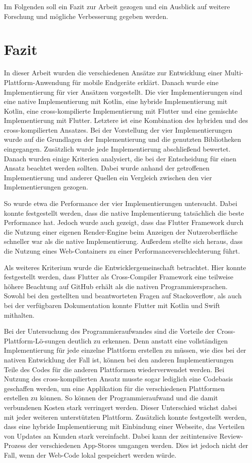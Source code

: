 Im Folgenden soll ein Fazit zur Arbeit gezogen und ein Ausblick auf weitere Forschung und mögliche Verbesserung gegeben werden.

\section{Fazit}
In dieser Arbeit wurden die verschiedenen Ansätze zur Entwicklung einer Multi-Plattform-Anwendung für mobile Endgeräte erklärt. Danach wurde eine Implementierung für vier Ansätzen vorgestellt. Die vier Implementierungen sind eine native Implementierung mit Kotlin, eine hybride Implementierung mit Kotlin, eine cross-kompilierte Implementierung mit Flutter und eine gemischte Implementierung mit Flutter. Letztere ist eine Kombination des hybriden und des cross-kompilierten Ansatzes. Bei der Vorstellung der vier Implementierungen wurde auf die Grundlagen der Implementierung und die genutzten Bibliotheken eingegangen. Zusätzlich wurde jede Implementierung abschließend bewertet. Danach wurden einige Kriterien analysiert, die bei der Entscheidung für einen Ansatz beachtet werden sollten. Dabei wurde anhand der getroffenen Implementierung und anderer Quellen ein Vergleich zwischen den vier Implementierungen gezogen.

So wurde etwa die Performance der vier Implementierungen untersucht. Dabei konnte festgestellt werden, dass die native Implementierung tatsächlich die beste Performance hat. Jedoch wurde auch gezeigt, dass das Flutter Framework durch die Nutzung einer eigenen Render-Engine beim Anzeigen der Nutzeroberfläche schneller war als die native Implementierung. Außerdem stellte sich heraus, dass die Nutzung eines Web-Containers zu einer Performanceverschlechterung führt. 

Als weiteres Kriterium wurde die Entwicklergemeinschaft betrachtet.
Hier konnte festgestellt werden, dass Flutter als Cross-Compiler Framework eine teilweise höhere Beachtung auf GitHub erhält als die nativen Programmiersprachen. 
Sowohl bei den gestellten und beantworteten Fragen auf Stackoverflow, als auch bei der verfügbaren Dokumentation konnte Flutter mit Kotlin und Swift mithalten.

Bei der Untersuchung des Programmieraufwandes sind die Vorteile der Cross-Plattform-Lö-sungen deutlich zu erkennen. Denn anstatt eine vollständigen Implementierung für jede einzelne Plattform erstellen zu müssen, wie dies bei der nativen Entwicklung der Fall ist, können bei den anderen Implementierungen Teile des Codes für die anderen Plattformen wiederverwendet werden. Bei Nutzung des cross-kompilierten Ansatz musste sogar lediglich eine Codebasis geschaffen werden, um eine Applikation für die verschiedenen Plattformen erstellen zu können. So können der Programmieraufwand und die damit verbundenen Kosten stark verringert werden. Dieser Unterschied wächst dabei mit jeder weiteren unterstützten Plattform.
Zusätzlich konnte festgestellt werden, dass eine hybride Implementierung mit Einbindung einer Webseite, das Verteilen von Updates an Kunden stark vereinfacht. Dabei kann der zeitintensive Review-Prozess der verschiedenen App-Stores umgangen werden. Dies ist jedoch nicht der Fall, wenn der Web-Code lokal gespeichert werden würde.

